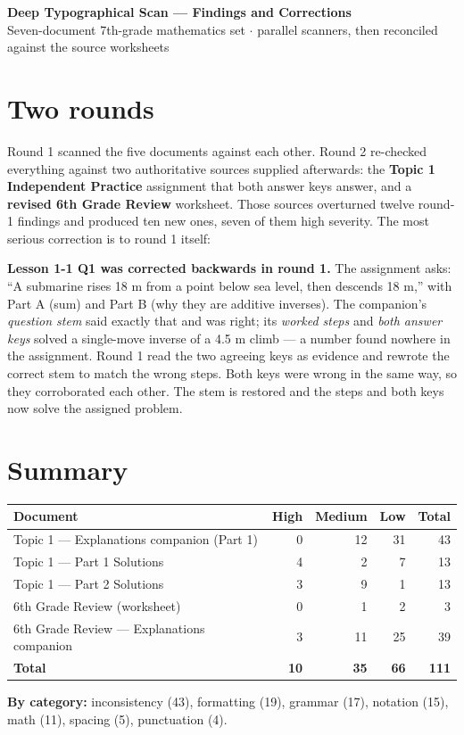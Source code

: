 \documentclass[11pt]{article}
\begin{document}
\begin{center}
{\LARGE\bfseries Deep Typographical Scan — Findings and Corrections}\\[0.4em]
{\normalsize Seven-document 7th-grade mathematics set \quad$\cdot$ parallel scanners, then reconciled against the source worksheets}
\end{center}
\vspace{0.6em}


\section*{Two rounds}
Round 1 scanned the five documents against each other. Round 2 re-checked
everything against two authoritative sources supplied afterwards: the
\textbf{Topic 1 Independent Practice} assignment that both answer keys answer,
and a \textbf{revised 6th Grade Review} worksheet. Those sources overturned
twelve round-1 findings and produced ten new ones, seven of them high severity.
The most serious correction is to round 1 itself:

\medskip\noindent\textbf{Lesson 1-1 Q1 was corrected backwards in round 1.}
The assignment asks: ``A submarine rises 18 m from a point below sea level, then
descends 18 m,'' with Part A (sum) and Part B (why they are additive inverses).
The companion's \emph{question stem} said exactly that and was right; its
\emph{worked steps} and \emph{both answer keys} solved a single-move inverse of a
4.5 m climb --- a number found nowhere in the assignment. Round 1 read the two
agreeing keys as evidence and rewrote the correct stem to match the wrong steps.
Both keys were wrong in the same way, so they corroborated each other. The stem
is restored and the steps and both keys now solve the assigned problem.

\section*{Summary}
\begin{center}\begin{tabular}{lrrrr}\toprule
Document & High & Medium & Low & Total\\\midrule
Topic 1 --- Explanations companion (Part 1) & 0 & 12 & 31 & 43\\
Topic 1 --- Part 1 Solutions & 4 & 2 & 7 & 13\\
Topic 1 --- Part 2 Solutions & 3 & 9 & 1 & 13\\
6th Grade Review (worksheet) & 0 & 1 & 2 & 3\\
6th Grade Review --- Explanations companion & 3 & 11 & 25 & 39\\
\midrule
\textbf{Total} & \textbf{10} & \textbf{35} & \textbf{66} & \textbf{111}\\
\bottomrule\end{tabular}\end{center}
\medskip\noindent\textbf{By category:} inconsistency (43), formatting (19), grammar (17), notation (15), math (11), spacing (5), punctuation (4).
\end{document}
